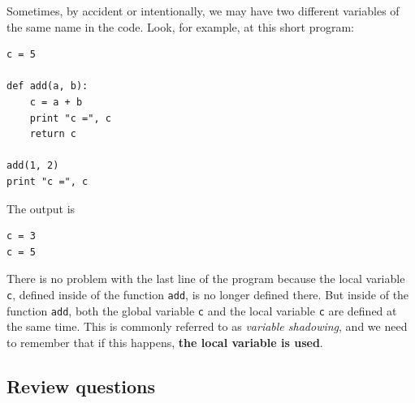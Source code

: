 Sometimes, by accident or intentionally, we may have two different 
variables of the same name in the code. Look, for example, at this short program:

\begin{verbatim}
c = 5

def add(a, b):
    c = a + b
    print "c =", c
    return c

add(1, 2)
print "c =", c
\end{verbatim}
The output is

\begin{verbatim}
c = 3
c = 5
\end{verbatim}
There is no 
problem with the last line of the program because the local variable {\tt c}, defined
inside of the function {\tt add}, is no longer defined there. But inside of the function
{\tt add}, both the global variable {\tt c} and the local variable {\tt c} are defined at 
the same time. This is commonly referred to as {\em variable shadowing}, and we need to 
remember that if this happens, {\bf the local variable is used}.

\subsection{Review questions}

